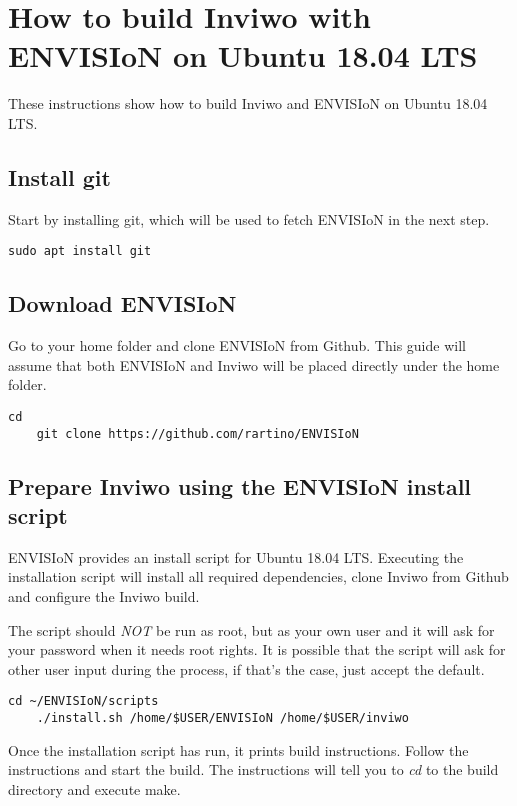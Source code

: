 \section{How to build Inviwo with ENVISIoN on Ubuntu
18.04 LTS}

\label{ch:install}
These instructions show how to build Inviwo and ENVISIoN on Ubuntu
18.04 LTS.

\subsection{Install git}
Start by installing git, which will be used to fetch ENVISIoN in the
next step.
\begin{lstlisting}[frame = single, breaklines=true]
    sudo apt install git
\end{lstlisting}

\subsection{Download ENVISIoN}
Go to your home folder and clone ENVISIoN from Github. This guide will
assume that both ENVISIoN and Inviwo will be placed directly under the
home folder.
\begin{lstlisting}[frame = single, breaklines=true]
    cd
    git clone https://github.com/rartino/ENVISIoN
\end{lstlisting}

\subsection{Prepare Inviwo using the ENVISIoN install script}
ENVISIoN provides an install script for Ubuntu 18.04 LTS. Executing
the installation script will install all required dependencies, clone
Inviwo from Github and configure the Inviwo build.

The script should \emph{NOT} be run as root, but as your own user and
it will ask for your password when it needs root rights. It is
possible that the script will ask for other user input during the
process, if that's the case, just accept the default.
\begin{lstlisting}[frame = single, breaklines = true]
    cd ~/ENVISIoN/scripts
    ./install.sh /home/$USER/ENVISIoN /home/$USER/inviwo
\end{lstlisting}

Once the installation script has run, it prints build instructions.
Follow the instructions and start the build. The instructions will
tell you to \emph{cd} to the build directory and execute make.

